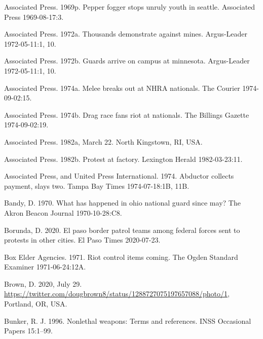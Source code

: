 \documentclass[
  11pt,
]{krantz}
\newlength{\cslhangindent}
\newlength{\cslentryspacingunit} %
\newenvironment{CSLReferences}[2] %
 {%
  \setlength{\parindent}{0pt}
  \ifodd #1
  \let\oldpar\par
  \def\par{\hangindent=\cslhangindent\oldpar}
  \fi
  \setlength{\parskip}{#2\cslentryspacingunit}
 }%
 {}
\begin{document}
\begin{CSLReferences}{1}{0}
\leavevmode{}%
Associated Press. 1969p. Pepper fogger stops unruly youth in seattle. Associated Press 1969-08-17:3.

\leavevmode{}%
Associated Press. 1972a. Thousands demonstrate against mines. Argus-Leader 1972-05-11:1, 10.

\leavevmode{}%
Associated Press. 1972b. Guards arrive on campus at minnesota. Argus-Leader 1972-05-11:1, 10.

\leavevmode{}%
Associated Press. 1974a. Melee breaks out at NHRA nationals. The Courier 1974-09-02:15.

\leavevmode{}%
Associated Press. 1974b. Drag race fans riot at nationals. The Billings Gazette 1974-09-02:19.

\leavevmode{}%
Associated Press. 1982a, March 22. North Kingstown, RI, USA.

\leavevmode{}%
Associated Press. 1982b. Protest at factory. Lexington Herald 1982-03-23:11.

\leavevmode{}%
Associated Press, and United Press International. 1974. Abductor collects payment, slays two. Tampa Bay Times 1974-07-18:1B, 11B.

\leavevmode{}%
Bandy, D. 1970. What has happened in ohio national guard since may? The Akron Beacon Journal 1970-10-28:C8.

\leavevmode{}%
Borunda, D. 2020. El paso border patrol teams among federal forces sent to protests in other cities. El Paso Times 2020-07-23.

\leavevmode{}%
Box Elder Agencies. 1971. Riot control items coming. The Ogden Standard Examiner 1971-06-24:12A.

\leavevmode{}%
Brown, D. 2020, July 29. \url{https://twitter.com/dougbrown8/status/1288727075197657088/photo/1}, Portland, OR, USA.

\leavevmode{}%
Bunker, R. J. 1996. Nonlethal weapons: Terms and references. INSS Occasional Papers 15:1--99.


\end{CSLReferences}
\end{document}
